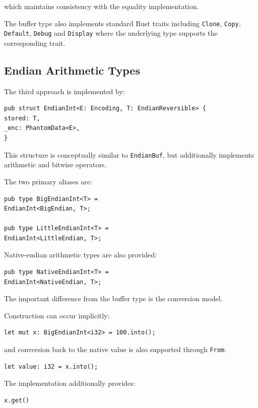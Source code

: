 which maintains consistency with the equality implementation.

The buffer type also implements standard Rust traits including \texttt{Clone}, \texttt{Copy}, \texttt{Default}, 
\texttt{Debug} and \texttt{Display} where the underlying type supports the corresponding trait.

\subsection{Endian Arithmetic Types}
The third approach is implemented by:

\begin{lstlisting}[style=rustblock]
pub struct EndianInt<E: Encoding, T: EndianReversible> {
stored: T,
_enc: PhantomData<E>,
}
\end{lstlisting}

This structure is conceptually similar to \texttt{EndianBuf}, but additionally implements arithmetic and 
bitwise operators.

The two primary aliases are:

\begin{lstlisting}[style=rustblock]
pub type BigEndianInt<T> =
EndianInt<BigEndian, T>;

pub type LittleEndianInt<T> =
EndianInt<LittleEndian, T>;
\end{lstlisting}

Native-endian arithmetic types are also provided:

\begin{lstlisting}[style=rustblock]
pub type NativeEndianInt<T> =
EndianInt<NativeEndian, T>;
\end{lstlisting}

The important difference from the buffer type is the conversion model.

Construction can occur implicitly:

\begin{lstlisting}[style=rustblock]
let mut x: BigEndianInt<i32> = 100.into();
\end{lstlisting}

and conversion back to the native value is also supported through \texttt{From}:

\begin{lstlisting}[style=rustblock]
let value: i32 = x.into();
\end{lstlisting}

The implementation additionally provides:

\begin{lstlisting}[style=rustblock]
x.get()
\end{lstlisting}

